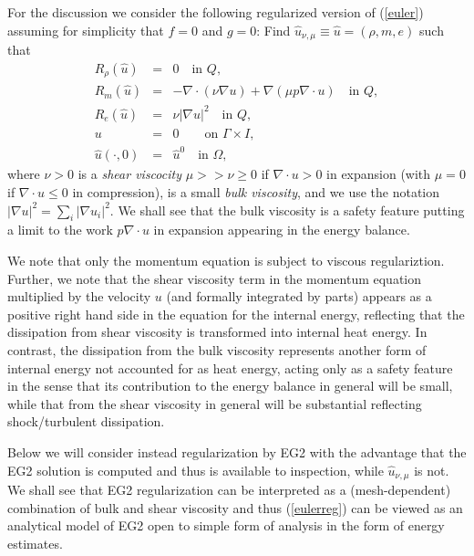 For the discussion we consider the following regularized version of
(\ref{euler}) assuming for simplicity that $f=0$ and $g=0$: Find $\hat
u_{\nu ,\mu}\equiv\hat u=(\rho ,m,e)$ such that
\begin{equation}\label{eulerreg}
\begin{array}{rcl}
R_\rho (\hat u)&=&  0 \quad \mbox{in } Q, \\
R_m (\hat u)&=&-\nabla\cdot (\nu\nabla u) +
\nabla (\mu p\nabla\cdot u) \quad \mbox{in } Q, \\
R_e (\hat u) &=&  \nu\vert \nabla u\vert^2 \quad \mbox{in } Q, \\
u&=&0\quad  \quad\mbox{on } \Gamma\times I,\\
\hat u(\cdot ,0)&=&\hat u^0\quad \mbox{in } \Omega ,
\end{array} 
\end{equation}
where $\nu >0$ is a \emph{shear viscocity} $\mu >>\nu \ge 0$ if
$\nabla\cdot u >0$ in expansion (with $\mu =0$ if $\nabla\cdot u \le
0$ in compression), is a small \emph{bulk viscosity}, and we use the
notation $\vert \nabla u\vert^2 =\sum_i\vert\nabla u_i\vert^2$. We
shall see that the bulk viscosity is a safety feature putting a limit
to the work $p\nabla\cdot u$ in expansion appearing in the energy
balance.

We note that only the momentum equation is subject to viscous
regulariztion. Further, we note that the shear viscosity term in the
momentum equation multiplied by the velocity $u$ (and formally
integrated by parts) appears as a positive right hand side in the
equation for the internal energy, reflecting that the dissipation from
shear viscosity is transformed into internal heat energy. In contrast,
the dissipation from the bulk viscosity represents another form of
internal energy not accounted for as heat energy, acting only as a
safety feature in the sense that its contribution to the energy
balance in general will be small, while that from the shear viscosity
in general will be substantial reflecting shock/turbulent dissipation.

Below we will consider instead regularization by EG2 with the
advantage that the EG2 solution is computed and thus is available to
inspection, while $\hat u_{\nu ,\mu}$ is not.  We shall see that EG2
regularization can be interpreted as a (mesh-dependent) combination of
bulk and shear viscosity and thus (\ref{eulerreg}) can be viewed as an
analytical model of EG2 open to simple form of analysis in the form of
energy estimates.

